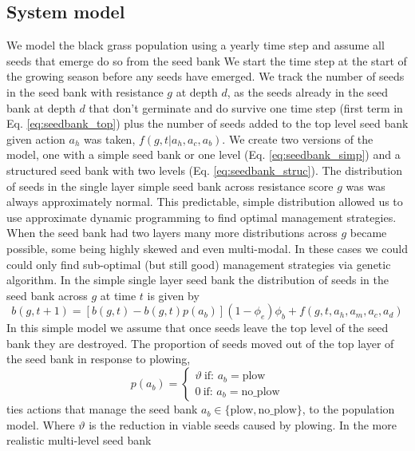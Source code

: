 \documentclass[12pt, a4paper]{article}
\begin{document}
\subsection{System model}
We model the black grass population using a yearly time step and assume all seeds that emerge do so from the seed bank We start the time step at the start of the growing season before any seeds have emerged. We track the number of seeds in the seed bank with resistance $g$ at depth $d$, as the seeds already in the seed bank at depth $d$ that don't germinate and do survive one time step (first term in Eq. \ref{eq:seedbank_top}) plus the number of seeds added to the top level seed bank given action $a_h$ was taken, $f(g, t|a_h, a_c, a_b)$. We create two versions of the model, one with a simple seed bank or one level (Eq. \ref{eq:seedbank_simp}) and a structured seed bank with two levels (Eq. \ref{eq:seedbank_struc}). The distribution of seeds in the single layer simple seed bank across resistance score $g$ was was always approximately normal. This predictable, simple distribution allowed us to use approximate dynamic programming to find optimal management strategies. When the seed bank had two layers many more distributions across $g$ became possible, some being highly skewed and even multi-modal. In these cases we could could only find sub-optimal (but still good) management strategies via genetic algorithm. In the simple single layer seed bank the distribution of seeds in the seed bank across $g$ at time $t$ is given by   
\begin{equation}\label{eq:seedbank_simp}
	b(g, t + 1) = [b(g, t) - b(g, t)p(a_b)](1 - \phi_e)\phi_b + f(g, t, a_h, a_m, a_c, a_d) 
\end{equation}
In this simple model we assume that once seeds leave the top level of the seed bank they are destroyed. The proportion of seeds moved out of the top layer of the seed bank in response to plowing,
\begin{equation}
	p(a_b) = \begin{cases}
		\vartheta~\text{if: }a_b = \text{plow}\\
		0~\text{if: }a_b = \text{no\_plow}
	\end{cases} 
\end{equation}
ties actions that manage the seed bank $a_b \in \{\text{plow}, \text{no\_plow}\}$, to the population model. Where $\vartheta$ is the reduction in viable seeds caused by plowing. In the more realistic multi-level seed bank
\end{document}
